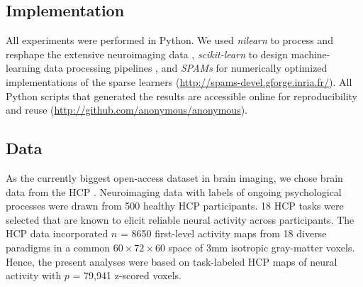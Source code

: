 \documentclass[runningheads,a4paper]{llncs}
\begin{document}
\subsection{Implementation}
All experiments were performed in Python.
We used \textit{nilearn} to process and resphape
the extensive neuroimaging data 
\cite{abrah14},
\textit{scikit-learn} to design machine-learning
data processing pipelines
\cite{pedr11},
and
\textit{SPAMs} for numerically optimized
implementations of the sparse learners
(\url{http://spams-devel.gforge.inria.fr/}).
All Python scripts that generated the results are
accessible online for reproducibility and reuse
(\url{http://github.com/anonymous/anonymous}).
\nopagebreak
\subsection{Data}
As the currently biggest open-access dataset in brain imaging,
we chose brain data from the HCP
\cite{barch2013}.
Neuroimaging data with labels of ongoing psychological processes
were drawn from 500
healthy HCP participants.
18 HCP tasks 
were selected that are known to elicit reliable neural activity
across participants.
The HCP data incorporated $n$ = 8650 first-level activity maps
from 18 diverse paradigms in a common $60\times72\times60$ space of
3mm isotropic gray-matter voxels.
Hence,
the present analyses were based on task-labeled HCP maps of neural
activity with $p$ = 79,941 z-scored voxels.
\end{document}
